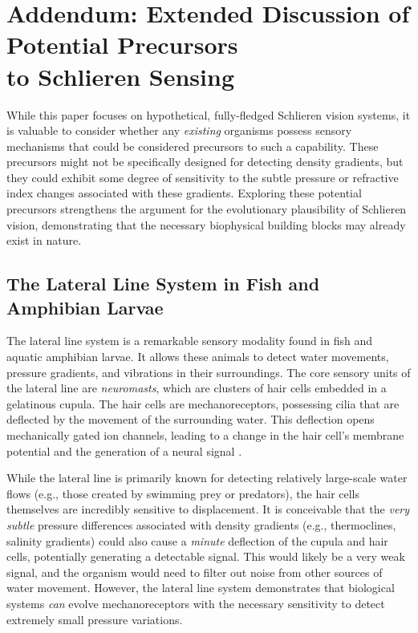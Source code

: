 \documentclass[11pt]{article}
\begin{document}
\appendix
\section{Addendum: Extended Discussion of Potential Precursors\\to Schlieren Sensing}

While this paper focuses on hypothetical, fully-fledged Schlieren vision systems, it is valuable to consider whether any \textit{existing} organisms possess sensory mechanisms that could be considered precursors to such a capability. These precursors might not be specifically designed for detecting density gradients, but they could exhibit some degree of sensitivity to the subtle pressure or refractive index changes associated with these gradients. Exploring these potential precursors strengthens the argument for the evolutionary plausibility of Schlieren vision, demonstrating that the necessary biophysical building blocks may already exist in nature.

\subsection{The Lateral Line System in Fish and Amphibian Larvae}

The lateral line system \cite{Dijkgraaf1963LateralLine} is a remarkable sensory modality found in fish and aquatic amphibian larvae. It allows these animals to detect water movements, pressure gradients, and vibrations in their surroundings. The core sensory units of the lateral line are \textit{neuromasts}, which are clusters of hair cells embedded in a gelatinous cupula. The hair cells are mechanoreceptors, possessing cilia that are deflected by the movement of the surrounding water. This deflection opens mechanically gated ion channels, leading to a change in the hair cell's membrane potential and the generation of a neural signal \cite{Hudspeth1989EarWorks}.

While the lateral line is primarily known for detecting relatively large-scale water flows (e.g., those created by swimming prey or predators), the hair cells themselves are incredibly sensitive to displacement. It is conceivable that the \textit{very subtle} pressure differences associated with density gradients (e.g., thermoclines, salinity gradients) could also cause a \textit{minute} deflection of the cupula and hair cells, potentially generating a detectable signal. This would likely be a very weak signal, and the organism would need to filter out noise from other sources of water movement. However, the lateral line system demonstrates that biological systems \textit{can} evolve mechanoreceptors with the necessary sensitivity to detect extremely small pressure variations.
\end{document}
